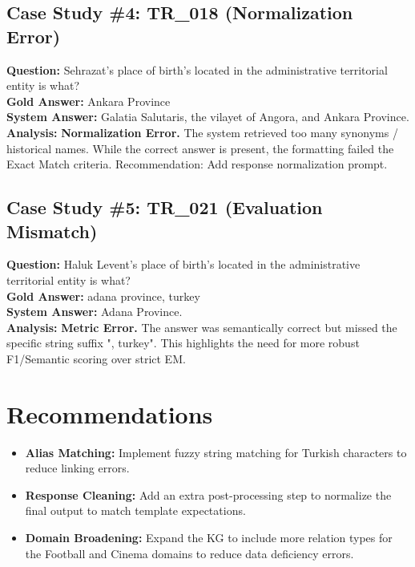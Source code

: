 \documentclass{article}
\begin{document}
\subsection{Case Study \#4: TR\_018 (Normalization Error)}
\textbf{Question:} Sehrazat's place of birth's located in the administrative territorial entity is what? \\
\textbf{Gold Answer:} Ankara Province \\
\textbf{System Answer:} Galatia Salutaris, the vilayet of Angora, and Ankara Province. \\
\textbf{Analysis:} \textbf{Normalization Error.} The system retrieved too many synonyms / historical names. While the correct answer is present, the formatting failed the Exact Match criteria. Recommendation: Add response normalization prompt.

\subsection{Case Study \#5: TR\_021 (Evaluation Mismatch)}
\textbf{Question:} Haluk Levent's place of birth's located in the administrative territorial entity is what? \\
\textbf{Gold Answer:} adana province, turkey \\
\textbf{System Answer:} Adana Province. \\
\textbf{Analysis:} \textbf{Metric Error.} The answer was semantically correct but missed the specific string suffix ", turkey". This highlights the need for more robust F1/Semantic scoring over strict EM.

\section{Recommendations}
\begin{itemize}
    \item \textbf{Alias Matching:} Implement fuzzy string matching for Turkish characters to reduce linking errors.
    \item \textbf{Response Cleaning:} Add an extra post-processing step to normalize the final output to match template expectations.
    \item \textbf{Domain Broadening:} Expand the KG to include more relation types for the Football and Cinema domains to reduce data deficiency errors.
\end{itemize}
\end{document}
